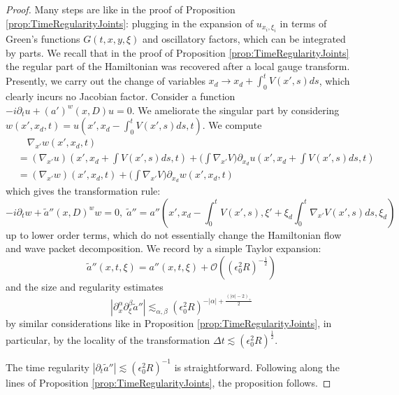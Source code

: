 \documentclass{amsart}
\theoremstyle{definition}
\begin{document}
\begin{proof}
Many steps are like in the proof of Proposition \ref{prop:TimeRegularityJoints}: plugging in the expansion of $u_{x_i,\xi_i}$ in terms of Green's functions $G(t,x,y,\xi)$ and oscillatory factors, which can be integrated by parts. We recall that in the proof of Proposition \ref{prop:TimeRegularityJoints} the regular part of the Hamiltonian was recovered after a local gauge transform. Presently, we carry out the change of variables $x_d \to x_d + \int_0^t V(x',s) ds$, which clearly incurs no Jacobian factor. Consider a function $-i \partial_t u + (a')^w(x,D) u = 0$. We ameliorate the singular part by considering $w(x',x_d,t) = u(x',x_d-\int_0^t V(x',s) ds, t)$. We compute
\begin{equation*}
\begin{split}
&\quad \nabla_{x'} w(x',x_d,t)  \\
&= (\nabla_{x'} u)(x',x_d + \int V(x',s) ds, t) + \big( \int \nabla_{x'} V \big) \partial_{x_d} u(x',x_d+\int V(x',s) ds, t) \\
&= (\nabla_{x'} w)(x',x_d , t) + \big( \int \nabla_{x'} V \big) \partial_{x_d} w(x',x_d, t) 
\end{split}
\end{equation*}
which gives the transformation rule:
\begin{equation*}
-i \partial_t w + \tilde{a}''(x,D)^w w = 0, \; \tilde{a}'' = a''(x',x_d-\int_0^t V(x',s),\xi'+ \xi_d \int_0^t \nabla_{x'} V(x',s) ds, \xi_d)
\end{equation*}
up to lower order terms, which do not essentially change the Hamiltonian flow and wave packet decomposition. We record by a simple Taylor expansion:
\begin{equation*}
\tilde{a}''(x,t,\xi) = a''(x,t,\xi) + \mathcal{O}((\epsilon_0^2 R)^{-\frac{1}{2}})
\end{equation*}
and the size and regularity estimates
\begin{equation*}
|\partial_x^{\alpha} \partial_{\xi}^{\beta} \tilde{a}''| \lesssim_{\alpha,\beta} (\epsilon_0^2 R)^{-|\alpha| + \frac{(|\alpha|-2)_+}{2}}
\end{equation*}
by similar considerations like in Proposition \ref{prop:TimeRegularityJoints}, in particular, by the locality of the transformation $\Delta t \lesssim (\epsilon_0^2 R)^{\frac{1}{2}}$.

The time regularity $|\partial_t \tilde{a}''| \lesssim (\epsilon_0^2 R)^{-1}$ is straightforward. Following along the lines of Proposition \ref{prop:TimeRegularityJoints}, the proposition follows.
\end{proof}
\end{document}
